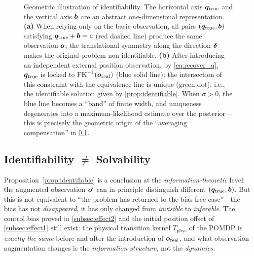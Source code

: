 \begin{figure}[!htb]
  \caption{Geometric illustration of identifiability. The horizontal axis $\bm{q}_\text{true}$ and the vertical axis $\bm{b}$ are an abstract one-dimensional representation. \textbf{(a)} When relying only on the basic observation, all pairs $(\bm{q}_\text{true}, \bm{b})$ satisfying $\bm{q}_\text{true} + \bm{b} = c$ (red dashed line) produce the same observation $\bm{o}$; the translational symmetry along the direction $\bm{\delta}$ makes the original problem non-identifiable. \textbf{(b)} After introducing an independent external position observation, by \cref{eq:recover_q}, $\bm{q}_\text{true}$ is locked to $\text{FK}^{-1}(\bm{o}_\text{real})$ (blue solid line); the intersection of this constraint with the equivalence line is unique (green dot), i.e., the identifiable solution given by \cref{prop:identifiable}. When $\sigma > 0$, the blue line becomes a ``band'' of finite width, and uniqueness degenerates into a maximum-likelihood estimate over the posterior---this is precisely the geometric origin of the ``averaging compensation'' in \cref{subsec:identifiability_vs_solvability}.}
  \label{fig:identifiability}
\end{figure}

\subsection{Identifiability \texorpdfstring{$\neq$}{!=} Solvability}\label{subsec:identifiability_vs_solvability}

Proposition~\ref{prop:identifiable} is a conclusion at the \emph{information-theoretic} level: the augmented observation $\bm{o}'$ can in principle distinguish different $(\bm{q}_{\text{true}}, \bm{b})$. But this is not equivalent to ``the problem has returned to the bias-free case''---the bias has not \emph{disappeared}, it has only changed from \emph{invisible} to \emph{inferable}. The control bias proved in \cref{subsec:effect2} and the initial position offset of \cref{subsec:effect1} still exist: the physical transition kernel $T_{\text{phys}}$ of the POMDP is \emph{exactly the same} before and after the introduction of $\bm{o}_{\text{real}}$, and what observation augmentation changes is the \emph{information structure}, not the \emph{dynamics}.

